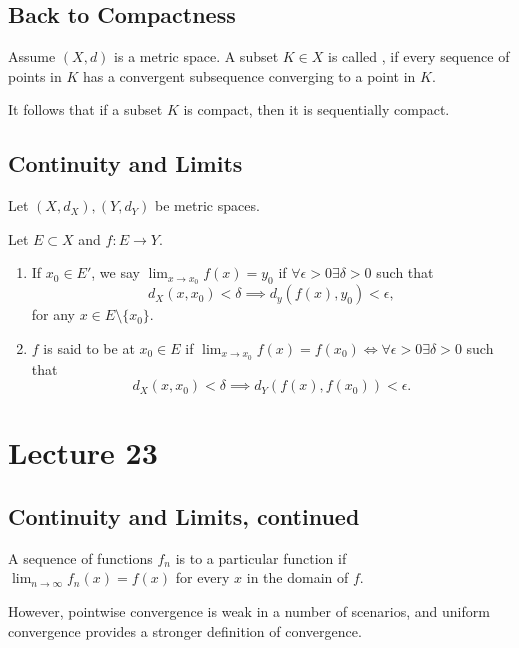 \documentclass{book}
\begin{document}
\subsection{Back to Compactness}
\begin{defn}
    Assume $(X, d)$ is a metric space. A subset $K \in X$ is called , if every sequence of points in $K$ has a convergent subsequence converging to a point in $K$.
\end{defn}

It follows that if a subset $K$ is compact, then it is sequentially compact.

\subsection{Continuity and Limits}
Let $(X, d_X), (Y, d_Y)$ be metric spaces. 

\begin{defn}
    Let $E \subset X$ and $f: E \to Y$.
    \begin{enumerate}
        \item If $x_0 \in E'$, we say $\lim_{x \to x_0} f(x) = y_0$ if $\forall \epsilon > 0 \exists \delta > 0$ such that \[d_X(x, x_0) < \delta \implies d_y(f(x), y_0) < \epsilon,\] for any $x \in E \setminus \{x_0\}$.
        \item $f$ is said to be  at $x_0 \in E$ if $\lim_{x \to x_0} f(x) = f(x_0) \iff \forall \epsilon > 0 \exists \delta > 0$ such that \[d_X(x, x_0) < \delta \implies d_Y(f(x), f(x_0)) < \epsilon.\] 
    \end{enumerate}
\end{defn}

\section{Lecture 23}
\subsection{Continuity and Limits, continued}
\begin{definition}
    A sequence of functions $f_n$ is  to a particular function if $\lim_{n \to \infty} f_n(x) = f(x)$ for every $x$ in the domain of $f$.
\end{definition}

However, pointwise convergence is weak in a number of scenarios, and uniform convergence provides a stronger definition of convergence.
\end{document}
